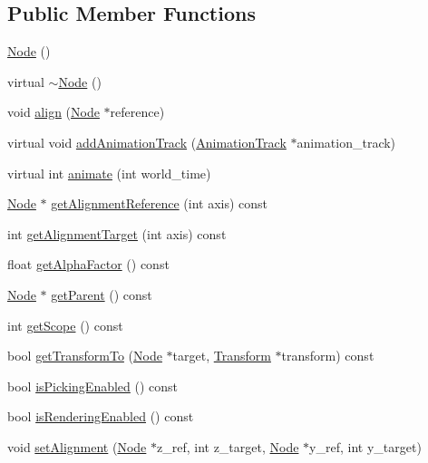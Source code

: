 \subsection*{Public Member Functions}
\begin{CompactItemize}
\item 
\hyperlink{classm3g_1_1Node_0d313fac56abd7ebe58a17f1530b879e}{Node} ()
\item 
virtual \hyperlink{classm3g_1_1Node_6fa6bf60f34f1e3efb0e59333428c9c8}{$\sim$Node} ()
\item 
void \hyperlink{classm3g_1_1Node_3db1b4be060fe3d4f3dbf9720ef85234}{align} (\hyperlink{classm3g_1_1Node}{Node} $\ast$reference)
\item 
virtual void \hyperlink{classm3g_1_1Node_415c0b110f95410ded9b85e5d99a496b}{addAnimationTrack} (\hyperlink{classm3g_1_1AnimationTrack}{AnimationTrack} $\ast$animation\_\-track)
\item 
virtual int \hyperlink{classm3g_1_1Node_8aad1ceab4c2a03609c8a42324ce484d}{animate} (int world\_\-time)
\item 
\hyperlink{classm3g_1_1Node}{Node} $\ast$ \hyperlink{classm3g_1_1Node_ca338390bd2dee287fe6f5cbc4e094e1}{getAlignmentReference} (int axis) const 
\item 
int \hyperlink{classm3g_1_1Node_e5bbf42b3d88193fda0b476e1b1da009}{getAlignmentTarget} (int axis) const 
\item 
float \hyperlink{classm3g_1_1Node_bf7e8f9d9f530274aaf27e69910f8689}{getAlphaFactor} () const 
\item 
\hyperlink{classm3g_1_1Node}{Node} $\ast$ \hyperlink{classm3g_1_1Node_ce26c2757f265bc6038e6818d2eb6ad9}{getParent} () const 
\item 
int \hyperlink{classm3g_1_1Node_a3c291c19cf805338fa4ad3c3deb663a}{getScope} () const 
\item 
bool \hyperlink{classm3g_1_1Node_206a2e95eb7db42e6880414f77858113}{getTransformTo} (\hyperlink{classm3g_1_1Node}{Node} $\ast$target, \hyperlink{classm3g_1_1Transform}{Transform} $\ast$transform) const 
\item 
bool \hyperlink{classm3g_1_1Node_b3187e5056afa4a94af03e34125c86b1}{isPickingEnabled} () const 
\item 
bool \hyperlink{classm3g_1_1Node_95020b155afed9552cc55377b09b1e86}{isRenderingEnabled} () const 
\item 
void \hyperlink{classm3g_1_1Node_dd1627aba90e63c166ecd3d7463d735a}{setAlignment} (\hyperlink{classm3g_1_1Node}{Node} $\ast$z\_\-ref, int z\_\-target, \hyperlink{classm3g_1_1Node}{Node} $\ast$y\_\-ref, int y\_\-target)

\end{CompactItemize}
